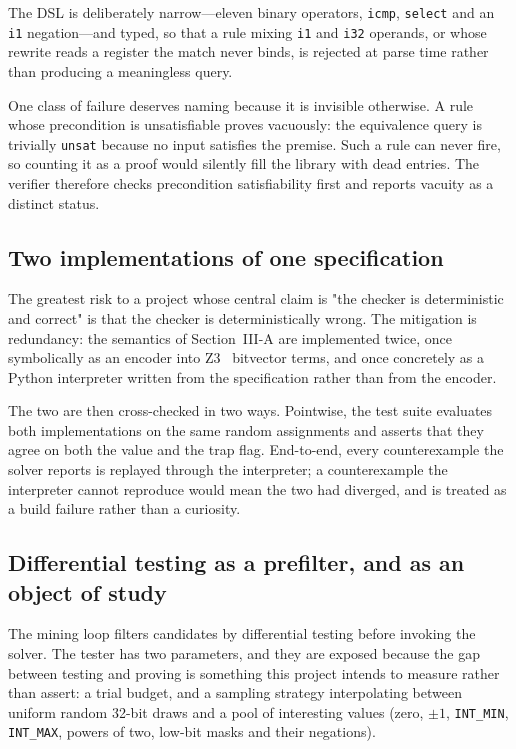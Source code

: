 \documentclass[conference]{IEEEtran}
\begin{document}
The DSL is deliberately narrow---eleven binary operators, \texttt{icmp},
\texttt{select} and an \texttt{i1} negation---and typed, so that a rule mixing
\texttt{i1} and \texttt{i32} operands, or whose rewrite reads a register the
match never binds, is rejected at parse time rather than producing a
meaningless query.

One class of failure deserves naming because it is invisible otherwise. A rule
whose precondition is unsatisfiable proves vacuously: the equivalence query is
trivially \texttt{unsat} because no input satisfies the premise. Such a rule can
never fire, so counting it as a proof would silently fill the library with dead
entries. The verifier therefore checks precondition satisfiability first and
reports vacuity as a distinct status.

\subsection{Two implementations of one specification}

The greatest risk to a project whose central claim is "the checker is
deterministic and correct" is that the checker is deterministically wrong. The
mitigation is redundancy: the semantics of Section~III-A are implemented twice,
once symbolically as an encoder into Z3~\cite{z3} bitvector terms, and once
concretely as a Python interpreter written from the specification rather than
from the encoder.

The two are then cross-checked in two ways. Pointwise, the test suite evaluates
both implementations on the same random assignments and asserts that they agree
on both the value and the trap flag. End-to-end, every counterexample the
solver reports is replayed through the interpreter; a counterexample the
interpreter cannot reproduce would mean the two had diverged, and is treated as
a build failure rather than a curiosity.

\subsection{Differential testing as a prefilter, and as an object of study}
\label{sec:difftest}

The mining loop filters candidates by differential testing before invoking the
solver. The tester has two parameters, and they are exposed because the gap
between testing and proving is something this project intends to measure rather
than assert: a trial budget, and a sampling strategy interpolating between
uniform random 32-bit draws and a pool of interesting values (zero, $\pm 1$,
\texttt{INT\_MIN}, \texttt{INT\_MAX}, powers of two, low-bit masks and their
negations).
\end{document}
